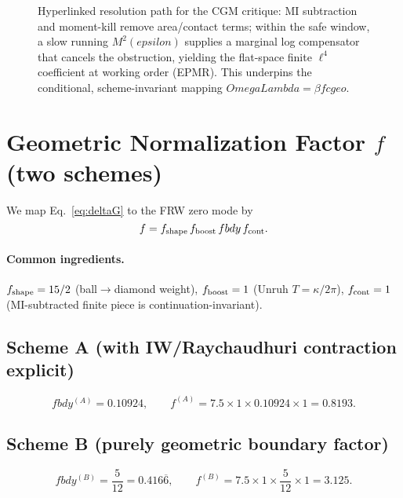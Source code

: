 \documentclass[aps,prd,onecolumn,superscriptaddress,nofootinbib]{revtex4-2}
\def\OmL{OmegaLambda}%
\def\cgeo{cgeo}%
\def\fbdy{fbdy}%
\def\eps{epsilon}%
\newcommand{\OmL}{\Omega_\Lambda}
\newcommand{\cgeo}{c_{\rm geo}}
\newcommand{\fbdy}{f_{\rm bdy}}
\newcommand{\eps}{\varepsilon}
\begin{document}
\begin{figure*}[t]
\caption{Hyperlinked resolution path for the CGM critique: MI subtraction and moment-kill remove area/contact terms; within the safe window, a slow running $M^2(\eps)$ supplies a marginal log compensator that cancels the obstruction, yielding the flat-space finite $\ell^4$ coefficient at working order (EPMR). This underpins the conditional, scheme-invariant mapping $\OmL=\beta f\cgeo$.}
\label{fig:cgm-diagram}
\end{figure*}

\section{Geometric Normalization Factor \texorpdfstring{$f$}{f} (two schemes)}
\label{sec:f-norm}
We map Eq.~\eqref{eq:deltaG} to the FRW zero mode by
\begin{equation}
f = f_{\rm shape}\, f_{\rm boost}\, \fbdy\, f_{\rm cont}.
\end{equation}

\paragraph*{Common ingredients.}
$f_{\rm shape}=15/2$ (ball$\to$diamond weight), $f_{\rm boost}=1$ (Unruh $T=\kappa/2\pi$), $f_{\rm cont}=1$ (MI-subtracted finite piece is continuation-invariant).

\subsection{Scheme A (with IW/Raychaudhuri contraction explicit)}
\[
\fbdy^{(A)}=0.10924,\qquad
f^{(A)}=7.5\times 1 \times 0.10924 \times 1=0.8193.
\]

\subsection{Scheme B (purely geometric boundary factor)}
\[
\fbdy^{(B)}=\frac{5}{12}=0.416\overline{6},\qquad
f^{(B)}=7.5\times 1 \times \frac{5}{12}\times 1=3.125.
\]
\end{document}
